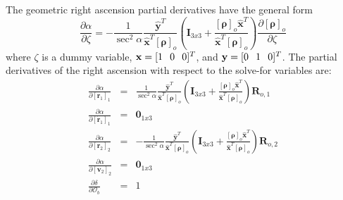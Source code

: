 The geometric right ascension partial derivatives have the general
form
%
\begin{equation}
    \frac{\partial \alpha}{\partial \zeta} = -\frac{1}{\sec^2{\alpha}}\frac{\hat{\mathbf{y}}^T}{\hat{\mathbf{x}}^T\left[\boldsymbol{\rho}\right]_o }
    \left(\mathbf{I}_{3x3} + \frac{\left[\boldsymbol{\rho}\right]_o
    \hat{\mathbf{x}}^T}{\hat{\mathbf{x}}^T\left[\boldsymbol{\rho}\right]_o } \right)\frac{\partial \left[\boldsymbol{\rho}\right]_o }{\partial \zeta}
\end{equation}
%
where $\zeta$ is a dummy variable, $\mathbf{x} = [1 \hspace{.1 in} 0
\hspace{0.1 in} 0]^T$, and $\mathbf{y} = [0 \hspace{.1 in} 1
\hspace{0.1 in} 0]^T$.  The partial derivatives of the right
ascension with respect to the solve-for variables are:
%
\begin{eqnarray}
    \frac{\partial \alpha}{\partial \left[ \mathbf{r}_1 \right]_{1}} & = &
    \frac{1}{\sec^2{\alpha}}\frac{\hat{\mathbf{y}}^T}{\hat{\mathbf{x}}^T\left[\boldsymbol{\rho}\right]_o }
    \left(\mathbf{I}_{3x3} + \frac{\left[\boldsymbol{\rho}\right]_o
    \hat{\mathbf{x}}^T}{\hat{\mathbf{x}}^T\left[\boldsymbol{\rho}\right]_o } \right)\mathbf{R}_{o,1}  \\
    \frac{\partial \alpha}{\partial \left[ \dot{\mathbf{r}}_1 \right]_{1}} & = & \mathbf{0}_{1x3} \\
    \frac{\partial \alpha}{\partial \left[ \mathbf{r}_2 \right]_{2}} & = &
     - \frac{1}{\sec^2{\alpha}}\frac{\hat{\mathbf{y}}^T}{\hat{\mathbf{x}}^T\left[\boldsymbol{\rho}\right]_o }
    \left(\mathbf{I}_{3x3} + \frac{\left[\boldsymbol{\rho}\right]_o
    \hat{\mathbf{x}}^T}{\hat{\mathbf{x}}^T\left[\boldsymbol{\rho}\right]_o } \right)\mathbf{R}_{o,2}\\
    \frac{\partial \alpha}{\partial \left[ \mathbf{v}_2 \right]_{2}} & = & \mathbf{0}_{1x3}\\
    \frac{\partial \delta}{\partial  \mathcal{O}_b } & = & 1
\end{eqnarray}








